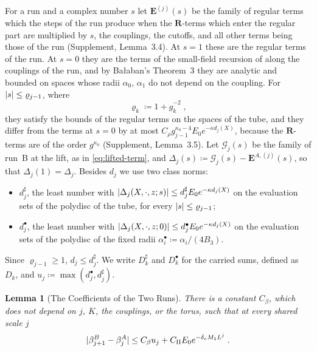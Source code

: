 \documentclass[11pt]{preprint}
\DeclarePairedDelimiter{\abs}{\lvert}{\rvert}
\numberwithin{equation}{section}
\newtheorem{lemma}[theorem]{Lemma}
\theoremstyle{definition}
\theoremstyle{remark}
\theoremstyle{plain}
\begin{document}
For a run and a complex number $s$ let $\mathbf E^{(j)}(s)$ be the family of regular terms which the steps of the run produce when the $\mathbf R$-terms which enter the regular part \cite[p.~271]{BalabanCRE} are multiplied by $s$, the couplings, the cutoffs, and all other terms being those of the run (Supplement, Lemma~3.4). At $s = 1$ these are the regular terms of the run. At $s = 0$ they are the terms of the small-field recursion of \cite{BalabanRG1,BalabanRG2} along the couplings of the run, and by Ba{\l}aban's Theorem~3 \cite[p.~264]{BalabanRG1} they are analytic and bounded on spaces whose radii $\alpha_0$, $\alpha_1$ do not depend on the coupling. For $\abs s \leq \varrho_{j-1}$, where
\begin{equation}\label{eq:family-radius}
    \varrho_k \coloneqq 1 + \hat g_k^{-2}\;,
\end{equation}
they satisfy the bounds of the regular terms on the spaces of the tube, and they differ from the terms at $s = 0$ by at most $C_\rho g_{j-1}^{\kappa_0-4}E_0e^{-\kappa d_j(X)}$, because the $\mathbf R$-terms are of the order $g^{\kappa_0}$ (Supplement, Lemma~3.5). Let $\mathcal G_j(s)$ be the family of run~B at the lift, as in \eqref{eq:lifted-term}, and $\Delta_j(s) \coloneqq \mathcal G_j(s) - \mathbf E^{A,(j)}(s)$, so that $\Delta_j(1) = \Delta_j$. Besides $d_j$ we use two class norms:
\begin{itemize}
\item $d^\sharp_j$, the least number with $\abs{\Delta_j(X, \cdot, z; s)} \leq d^\sharp_jE_0e^{-\kappa d_j(X)}$ on the evaluation sets of the polydisc of the tube, for every $\abs s \leq \varrho_{j-1}$;
\item $d^\bullet_j$, the least number with $\abs{\Delta_j(X, \cdot, z; 0)} \leq d^\bullet_jE_0e^{-\kappa d_j(X)}$ on the evaluation sets of the polydisc of the fixed radii $\alpha^\bullet_i \coloneqq \alpha_i/(4B_3)$.
\end{itemize}
Since $\varrho_{j-1} \geq 1$, $d_j \leq d^\sharp_j$. We write $D^\sharp_k$ and $D^\bullet_k$ for the carried sums, defined as $D_k$, and $u_j \coloneqq \max(d^\bullet_j, d^\sharp_j)$.

\begin{lemma}[The Coefficients of the Two Runs]\label{lem:coefficient-difference}
There is a constant $C_\beta$, which does not depend on $j$, $K$, the couplings, or the torus, such that at every shared scale $j$
\begin{equation}\label{eq:coefficient-difference}
    \abs{\beta^B_{j+1} - \beta^A_j} \leq C_\beta u_j + C_\Pi E_0e^{-\delta_cM_1L^j}\;.
\end{equation}
\end{lemma}
\end{document}
